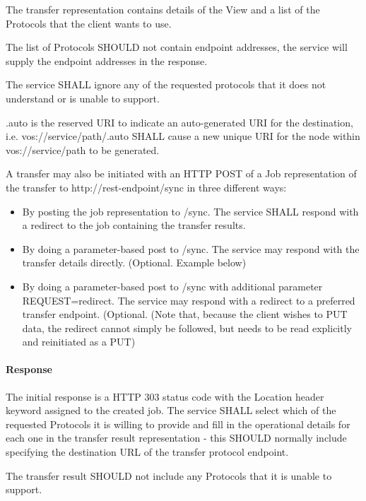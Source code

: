 \documentclass[11pt,a4paper]{ivoa}
\begin{document}
The transfer representation contains details of the View and a list of the Protocols that the client wants to use.

The list of Protocols SHOULD not contain endpoint addresses, the service will supply the endpoint addresses in the response.

The service SHALL ignore any of the requested protocols that it does not understand or is unable to support.

.auto is the reserved URI to indicate an auto-generated URI for the destination, i.e. vos://service/path/.auto SHALL cause a new unique URI for the node within vos://service/path to be generated.

A transfer may also be initiated with an HTTP POST of a Job representation of the transfer to http://rest-endpoint/sync in three different ways:
\begin{itemize}
    \item By posting the job representation to /sync. The service SHALL respond with a redirect to the job containing the transfer results.
    \item By doing a parameter-based post to /sync. The service may respond with the transfer details directly. (Optional. Example below)
    \item By doing a parameter-based post to /sync with additional parameter REQUEST=redirect. The service may respond with a redirect to a preferred transfer endpoint. (Optional. (Note that, because the client wishes to PUT data, the redirect cannot simply be followed, but needs to be read explicitly and reinitiated as a PUT)
\end{itemize}

\paragraph{Response}
The initial response is a HTTP 303 status code with the Location header keyword assigned to the created job.
The service SHALL select which of the requested Protocols it is willing to provide and fill in the operational details for each one in the transfer result representation - this SHOULD normally include specifying the destination URL of the transfer protocol endpoint.

The transfer result SHOULD not include any Protocols that it is unable to support.
\end{document}
